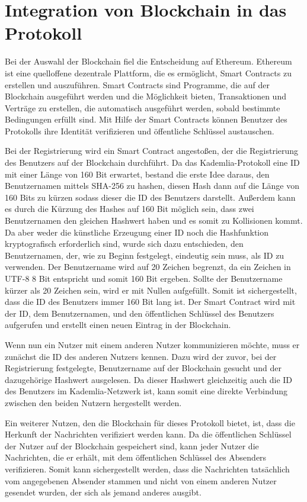\section{Integration von Blockchain in das Protokoll}
\label{sec:blockchainintegration}

Bei der Auswahl der Blockchain fiel die Entscheidung auf Ethereum. Ethereum ist eine quelloffene dezentrale Plattform, die es ermöglicht, Smart Contracts zu erstellen und auszuführen. Smart Contracts sind Programme, die auf der Blockchain ausgeführt werden und die Möglichkeit bieten, Transaktionen und Verträge zu erstellen, die automatisch ausgeführt werden, sobald bestimmte Bedingungen erfüllt sind. Mit Hilfe der Smart Contracts können Benutzer des Protokolls ihre Identität verifizieren und öffentliche Schlüssel austauschen. 


Bei der Registrierung wird ein Smart Contract angestoßen, der die Registrierung des Benutzers auf der Blockchain durchführt. Da das Kademlia-Protokoll eine ID mit einer Länge von 160 Bit erwartet, bestand die erste Idee daraus, den Benutzernamen mittels SHA-256 zu hashen, diesen Hash dann auf die Länge von 160 Bits zu kürzen sodass dieser die ID des Benutzers darstellt. Außerdem kann es durch die Kürzung des Hashes auf 160 Bit möglich sein, dass zwei Benutzernamen den gleichen Hashwert haben und es somit zu Kollisionen kommt.
Da aber weder die künstliche Erzeugung einer ID noch die Hashfunktion kryptografisch erforderlich sind, wurde sich dazu entschieden, den Benutzernamen, der, wie zu Beginn festgelegt, eindeutig sein muss, als ID zu verwenden. Der Benutzername wird auf 20 Zeichen begrenzt, da ein Zeichen in UTF-8 8 Bit entspricht und somit 160 Bit ergeben. Sollte der Benutzername kürzer als 20 Zeichen sein, wird er mit Nullen aufgefüllt. Somit ist sichergestellt, dass die ID des Benutzers immer 160 Bit lang ist. Der Smart Contract wird mit der ID, dem Benutzernamen, und den öffentlichen Schlüssel des Benutzers aufgerufen und erstellt einen neuen Eintrag in der Blockchain.

Wenn nun ein Nutzer mit einem anderen Nutzer kommunizieren möchte, muss er zunächst die ID des anderen Nutzers kennen. Dazu wird der zuvor, bei der Registrierung festgelegte, Benutzername auf der Blockchain gesucht und der dazugehörige Hashwert ausgelesen. Da dieser Hashwert gleichzeitig auch die ID des Benutzers im Kademlia-Netzwerk ist, kann somit eine direkte Verbindung zwischen den beiden Nutzern hergestellt werden.

Ein weiterer Nutzen, den die Blockchain für dieses Protokoll bietet, ist, dass die Herkunft der Nachrichten verifiziert werden kann. Da die öffentlichen Schlüssel der Nutzer auf der Blockchain gespeichert sind, kann jeder Nutzer die Nachrichten, die er erhält, mit dem öffentlichen Schlüssel des Absenders verifizieren. Somit kann sichergestellt werden, dass die Nachrichten tatsächlich vom angegebenen Absender stammen und nicht von einem anderen Nutzer gesendet wurden, der sich als jemand anderes ausgibt.

